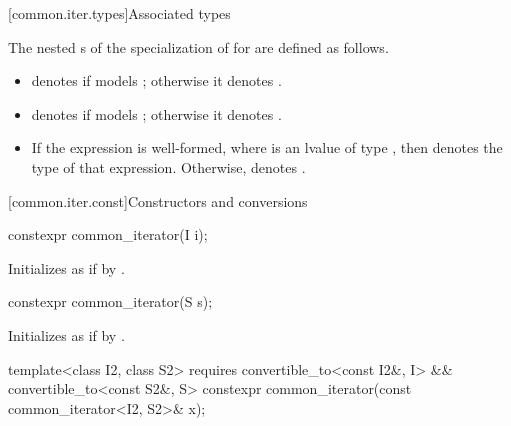[common.iter.types]{Associated types}

\pnum
The nested s of the specialization of
 for  are defined as follows.
\begin{itemize}
\item
{} denotes 
if  models ;
otherwise it denotes .

\item
{} denotes
if 
models ;
otherwise it denotes .

\item
If the expression  is well-formed,
where  is an lvalue of type ,
then  denotes the type of that expression.
Otherwise,  denotes .
\end{itemize}

[common.iter.const]{Constructors and conversions}

%
\begin{itemdecl}
constexpr common_iterator(I i);
\end{itemdecl}

\begin{itemdescr}
\pnum
\effects
Initializes  as if by .
\end{itemdescr}

%
\begin{itemdecl}
constexpr common_iterator(S s);
\end{itemdecl}

\begin{itemdescr}
\pnum
\effects
Initializes  as if by
.
\end{itemdescr}

%
\begin{itemdecl}
template<class I2, class S2>
  requires convertible_to<const I2&, I> && convertible_to<const S2&, S>
    constexpr common_iterator(const common_iterator<I2, S2>& x);
\end{itemdecl}

